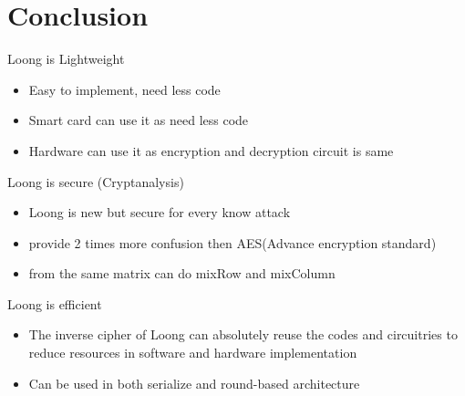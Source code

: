 \section{Conclusion}

\begin{frame}{Loong is Lightweight}
\begin{itemize}
    \item Easy to implement, need less code
    \pause
    \item Smart card can use it as need less code
    \pause
    \item Hardware can use it as encryption and decryption circuit is same
\end{itemize}
\end{frame}

\begin{frame}{Loong is secure (Cryptanalysis)}
    \begin{itemize}
        \item Loong is new but secure for every know attack
        \pause
        \item provide 2 times more confusion then AES(Advance encryption standard)
        \pause
        \item from the same matrix can do mixRow and mixColumn
    \end{itemize}
\end{frame}

\begin{frame}{Loong is efficient}
    \begin{itemize}
        \item The inverse cipher of Loong can absolutely reuse the codes and circuitries to reduce resources in software and hardware implementation
        \pause
        \item Can be used in both serialize and round-based architecture 
    \end{itemize}
\end{frame}